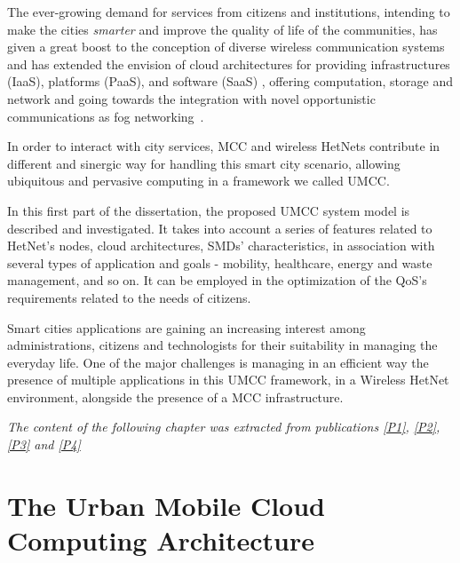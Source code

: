 \documentclass[twoside,openright]{report}
\begin{document}
The ever-growing demand for services from citizens and institutions, intending to make the cities \textit{smarter} and improve the quality of life of the communities, has given a great boost to the conception of diverse wireless communication systems and has extended the envision of cloud architectures for providing infrastructures (\gls{IaaS}), platforms (\gls{PaaS}), and software (\gls{SaaS})\cite{CCTaxonomy,fantacci09} , offering computation, storage and network and going towards the integration with novel opportunistic communications as fog networking~\cite{opportunistic, Bonomi2012, Bonomi2014}.

In order to  interact with city services, \gls{MCC} and wireless \glspl{HetNet} contribute in different and sinergic way for handling this smart city scenario, allowing ubiquitous and pervasive computing in a framework we called \gls{UMCC}.

In this first part of the dissertation, the proposed \gls{UMCC} system model is described and investigated. It takes into account a series of features related to \gls{HetNet}'s nodes, cloud architectures, \glspl{SMD}' characteristics, in association with several types of application and goals - mobility, healthcare, energy and waste management, and so on. 
It can be employed in the optimization of the \gls{QoS}'s requirements related to the needs of citizens. 

Smart cities applications are gaining an increasing interest among administrations, citizens and technologists for their suitability in managing the everyday life. 
One of the major challenges is managing in an efficient way the presence of multiple applications in this \gls{UMCC} framework, in a Wireless \gls{HetNet} environment, alongside the presence of a \gls{MCC} infrastructure. 

\vspace{1cm}
\textit{The content of the following chapter was extracted from publications \hyperref[P1]{[P1]}, \hyperref[P2]{[P2]}, \hyperref[P3]{[P3]} and \hyperref[P4]{[P4]}}

\chapter[The UMCC architecture]{The Urban Mobile Cloud Computing Architecture}
\label{chap:UMCC}
\end{document}
